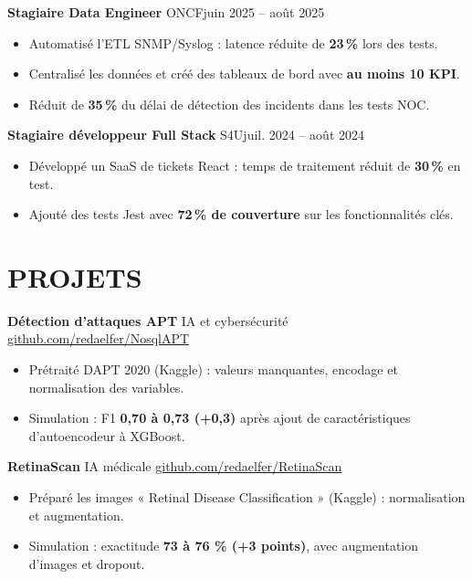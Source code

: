 \documentclass[11pt,a4paper]{article}
\newcommand{\entry}[2]{\noindent #1\hfill #2\par}
\newcommand{\jobgap}{\vspace{5pt}}
\begin{document}
\jobgap
\entry{\textbf{Stagiaire Data Engineer} \textbar{} ONCF}{juin 2025 -- août 2025}
\begin{itemize}
  \item Automatisé l'ETL SNMP/Syslog : latence réduite de \textbf{23\,\%} lors des tests.
  \item Centralisé les données et créé des tableaux de bord avec \textbf{au moins 10 KPI}.
  \item Réduit de \textbf{35\,\%} du délai de détection des incidents dans les tests NOC.
\end{itemize}

\jobgap
\entry{\textbf{Stagiaire développeur Full Stack} \textbar{} S4U}{juil. 2024 -- août 2024}
\begin{itemize}
  \item Développé un SaaS de tickets React : temps de traitement réduit de \textbf{30\,\%} en test.
  \item Ajouté des tests Jest avec \textbf{72\,\% de couverture} sur les fonctionnalités clés.
\end{itemize}

\section*{PROJETS}

\textbf{Détection d'attaques APT} \textbar{} IA et cybersécurité \textbar{} \href{https://github.com/redaelfer/NosqlAPT}{github.com/redaelfer/NosqlAPT}\par
\begin{itemize}
  \item Prétraité DAPT 2020 (Kaggle) : valeurs manquantes, encodage et normalisation des variables.
  \item Simulation : F1 \textbf{0,70 à 0,73 (+0,3)} après ajout de caractéristiques d’autoencodeur à XGBoost.
\end{itemize}

\jobgap
\textbf{RetinaScan} \textbar{} IA médicale \textbar{} \href{https://github.com/redaelfer/RetinaScan}{github.com/redaelfer/RetinaScan}\par
\begin{itemize}
  \item Préparé les images « Retinal Disease Classification » (Kaggle) : normalisation et augmentation.
  \item Simulation : exactitude \textbf{73 à 76 \% (+3 points)}, avec augmentation d’images et dropout.
\end{itemize}
\end{document}
